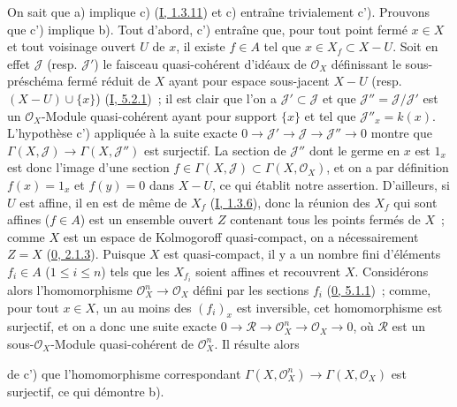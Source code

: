 On sait que a) implique c) (\hyperref[I.1.3.11-fr]{I, 1.3.11}) et c)
entraîne trivialement c'). Prouvons que c') implique b). Tout d'abord, c')
entraîne que, pour tout point fermé $x\in X$ et tout voisinage ouvert $U$ de
$x$, il existe $f\in A$ tel que $x\in X_f\subset X-U$. Soit en effet
$\mathcal{J}$ (resp. $\mathcal{J}'$) le faisceau quasi-cohérent d'idéaux de
$\mathcal{O}_X$ définissant le sous-préschéma fermé réduit de $X$ ayant pour
espace sous-jacent $X-U$ (resp. $(X-U)\cup\{x\}$)
(\hyperref[I.5.2.1-fr]{I, 5.2.1})~; il est clair que l'on a
$\mathcal{J}'\subset\mathcal{J}$ et que
$\mathcal{J}''=\mathcal{J}/\mathcal{J}'$ est un $\mathcal{O}_X$-Module
quasi-cohérent ayant pour support $\{x\}$ et tel que
$\mathcal{J}''_x=k(x)$. L'hypothèse c') appliquée à la suite exacte
$0\to\mathcal{J}'\to\mathcal{J}\to\mathcal{J}''\to0$ montre que
$\Gamma(X,\mathcal{J})\to\Gamma(X,\mathcal{J}'')$ est surjectif. La section
de $\mathcal{J}''$ dont le germe en $x$ est $1_x$ est donc l'image d'une
section $f\in\Gamma(X,\mathcal{J})\subset\Gamma(X,\mathcal{O}_X)$, et on a
par définition $f(x)=1_x$ et $f(y)=0$ dans $X-U$, ce qui établit notre
assertion. D'ailleurs, si $U$ est affine, il en est de même de $X_f$
(\hyperref[I.1.3.6-fr]{I, 1.3.6}), donc la réunion des $X_f$ qui sont affines
($f\in A$) est un ensemble ouvert $Z$ contenant tous les points fermés de
$X$~; comme $X$ est un espace de Kolmogoroff quasi-compact, on a
nécessairement $Z=X$ (\hyperref[0.2.1.3-fr]{0, 2.1.3}). Puisque $X$ est
quasi-compact, il y a un nombre fini d'éléments $f_i\in A$
($1\leq i\leq n$) tels que les $X_{f_i}$ soient affines et recouvrent $X$.
Considérons alors l'homomorphisme $\mathcal{O}_X^n\to\mathcal{O}_X$ défini
par les sections $f_i$ (\hyperref[0.5.1.1-fr]{0, 5.1.1})~; comme, pour tout
$x\in X$, un au moins des $(f_i)_x$ est inversible, cet homomorphisme est
surjectif, et on a donc une suite exacte
$0\to\mathcal{R}\to\mathcal{O}_X^n\to\mathcal{O}_X\to0$, où $\mathcal{R}$
est un sous-$\mathcal{O}_X$-Module quasi-cohérent de $\mathcal{O}_X^n$. Il
résulte alors


de c') que l'homomorphisme correspondant
$\Gamma(X,\mathcal{O}_X^n)\to\Gamma(X,\mathcal{O}_X)$ est surjectif, ce qui
démontre b).

